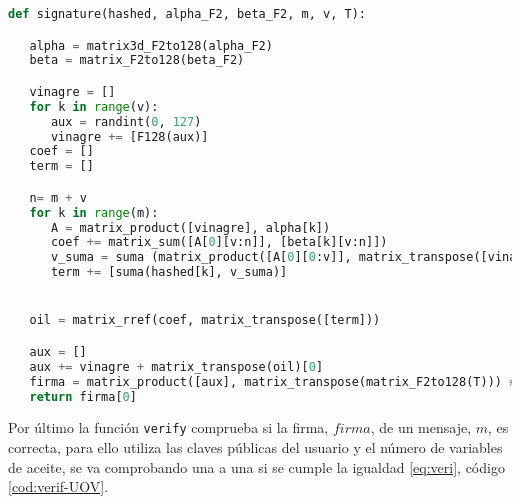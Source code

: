 \begin{lstlisting}[language=Python,caption=Firma del mensaje, label=cod:firma-UOV]
def signature(hashed, alpha_F2, beta_F2, m, v, T):

   alpha = matrix3d_F2to128(alpha_F2)
   beta = matrix_F2to128(beta_F2)

   vinagre = []
   for k in range(v):
      aux = randint(0, 127)
      vinagre += [F128(aux)]
   coef = []
   term = []

   n= m + v
   for k in range(m):
      A = matrix_product([vinagre], alpha[k])
      coef += matrix_sum([A[0][v:n]], [beta[k][v:n]])
      v_suma = suma (matrix_product([A[0][0:v]], matrix_transpose([vinagre]))[0][0], matrix_product([beta[k][0:v]], matrix_transpose([vinagre]))[0][0])
      term += [suma(hashed[k], v_suma)]


   oil = matrix_rref(coef, matrix_transpose([term]))

   aux = []
   aux += vinagre + matrix_transpose(oil)[0]
   firma = matrix_product([aux], matrix_transpose(matrix_F2to128(T))) #T = T.inverse()
   return firma[0]
\end{lstlisting}

Por último la función \texttt{verify} comprueba si la firma, $firma$, de un mensaje, $m$, es correcta, para ello utiliza las claves públicas del usuario y el número de variables de aceite, se va comprobando una a una si se cumple la igualdad \ref{eq:veri}, código \ref{cod:verif-UOV}.

\begin{table}[H]
	\begin{center}
	\centering
	\end{center}
	\caption{Parámetros de la función \texttt{verify}}
\end{table}

